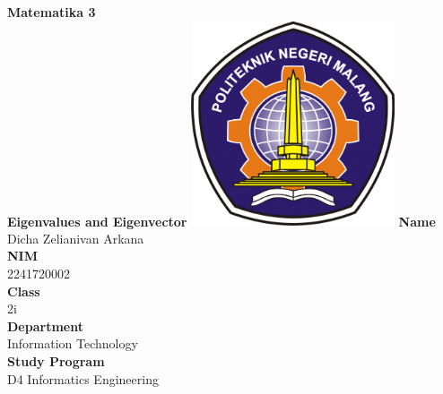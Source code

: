 \documentclass[12pt,titlepage]{article}
\newcommand{\vSubject}{Matematika 3}
\newcommand{\vSubtitle}{Eigenvalues and Eigenvector}
\newcommand{\vName}{Dicha Zelianivan Arkana}
\newcommand{\vNIM}{2241720002}
\newcommand{\vClass}{2i}
\newcommand{\vDepartment}{Information Technology}
\newcommand{\vStudyProgram}{D4 Informatics Engineering}
\begin{document}
\begin{titlepage}
    \centering
    \vfill
    {\bfseries\LARGE
        \vSubject\\
        \vskip0.25cm
        \vSubtitle
    }
    \vfill
    \includegraphics[width=6cm]{images/polinema-logo.png}
    \vfill
    {
        \textbf{Name}\\
        \vName\\
        \vskip0.5cm
        \textbf{NIM}\\
        \vNIM\\
        \vskip0.5cm
        \textbf{Class}\\
        \vClass\\
        \vskip0.5cm
        \textbf{Department}\\
        \vDepartment\\
        \vskip0.5cm
        \textbf{Study Program}\\
        \vStudyProgram
    }
\end{titlepage}
\end{document}
